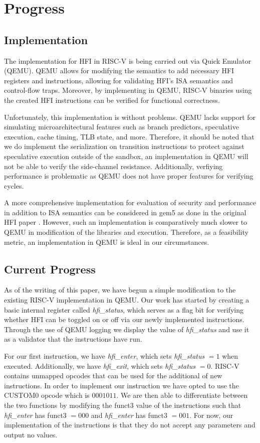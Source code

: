 \documentclass[conference,compsoc]{IEEEtran}
\begin{document}
\section{Progress}

\subsection{Implementation}
The implementation for HFI in RISC-V is being carried out via Quick Emulator (QEMU). 
QEMU allows for modifying the semantics to add necessary HFI registers and instructions, allowing for validating HFI's ISA semantics and control-flow traps. 
Moreover, by implementing in QEMU, RISC-V binaries using the created HFI instructions can be verified for functional correctness.

Unfortunately, this implementation is without problems. 
QEMU lacks support for simulating microarchitectural features such as branch predictors, speculative execution, cache timing, TLB state, and more.
Therefore, it should be noted that we do implement the serialization on transition instructions to protect against speculative execution outside of the sandbox, an implementation in QEMU will not be able to verify the side-channel resistance. 
Additionally, verfiying performance is problematic as QEMU does not have proper features for verifying cycles.

A more comprehensive implementation for evaluation of security and performance in addition to ISA semantics can be considered in gem5 as done in the original HFI paper \cite{HFI}. 
However, such an implementation is comparatively much slower to QEMU in modification of the libraries and execution. 
Therefore, as a feasibility metric, an implementation in QEMU is ideal in our circumstances.


\subsection{Current Progress}
As of the writing of this paper, we have begun a simple modification to the existing RISC-V implementation in QEMU.
Our work has started by creating a basic internal register called \textit{hfi\_status}, which serves as a flag bit for verifying whether HFI can be toggled on or off via our newly implemented instructions.
Through the use of QEMU logging we display the value of \textit{hfi\_status} and use it as a validator that the instructions have run.

For our first instruction, we have \textit{hfi\_enter}, which sets \textit{hfi\_status} $=1$ when executed. 
Additionally, we have \textit{hfi\_exit}, which sets \textit{hfi\_status} $=0$.
RISC-V contains unmapped opcodes that can be used for the additional of new instructions.
In order to implement our instruction we have opted to use the CUSTOM0 opcode which is $0001011$.
We are then able to differentiate between the two functions by modifying the funct3 value of the instructions such that \textit{hfi\_enter} has funct3 $= 000$ and \textit{hfi\_enter} has funct3 $= 001$.
For now, our implementation of the instructions is that they do not accept any parameters and output no values. 
\end{document}
